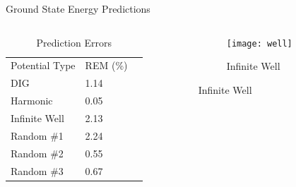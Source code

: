 \documentclass{beamer}
\begin{document}
\begin{frame}{Ground State Energy Predictions}
\begin{columns}
    \begin{column}{0.4\textwidth}
        \begin{table}[]
            \centering
            \caption{Prediction Errors}
            \begin{tabular}{lll}
            Potential Type & REM (\%) \\
            DIG            & 1.14     \\
            Harmonic       & 0.05     \\
            Infinite Well  & 2.13     \\
            Random \#1     & 2.24     \\
            Random \#2     & 0.55     \\
            Random \#3     & 0.67                    
            \end{tabular} 
        \end{table}
    \end{column}
    \begin{column}{0.8\textwidth}
    \graphicspath{{"../figs/training/"}}
    \begin{figure}[H]
        \begin{subfigure}[t]{0.80\textwidth}
            \texttt{[image: well]}
        \caption{Infinite Well}
        \end{subfigure}
    \end{figure}
    \end{column}
\end{columns}
\end{frame}
\end{document}
